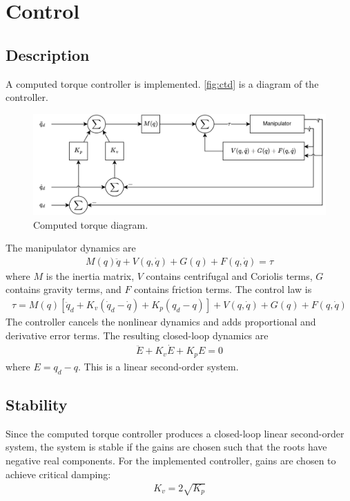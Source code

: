 \documentclass{article}
\begin{document}
\pagebreak
\section{Control}

\subsection{Description}

A computed torque controller is implemented. \autoref{fig:ctd} is a diagram of the controller.
\begin{figure}[h]
  \centering
  \includegraphics[width=0.75\linewidth]{media/computed_torque_diagram}
  \caption{Computed torque diagram.}
  \label{fig:ctd}
\end{figure}
The manipulator dynamics are
\begin{align}
  M(q)\ddot{q} + V(q, \dot{q}) + G(q) + F(q, \dot{q}) = \tau
\end{align}
where $M$ is the inertia matrix, $V$ contains centrifugal and Coriolis terms, $G$ contains gravity terms, and $F$
contains friction terms. The control law is
\begin{align}
  \tau = M(q)[\ddot{q}_d + K_v(\dot{q}_d - \dot{q}) + K_p(q_d - q)] + V(q, \dot{q}) + G(q) + F(q, \dot{q})
\end{align}
The controller cancels the nonlinear dynamics and adds proportional and derivative error terms.
The resulting closed-loop dynamics are
\begin{align}
  \ddot{E} + K_v \dot{E} + K_p E = 0 \label{eq:cld}
\end{align}
where $E = q_d - q$. This is a linear second-order system.

\subsection{Stability}

Since the computed torque controller produces a closed-loop linear second-order system, the system is stable if the
gains are chosen such that the roots have negative real components.
For the implemented controller, gains are chosen to achieve critical damping:
\begin{align}
  K_v = 2 \sqrt{K_p}
\end{align}
\end{document}
